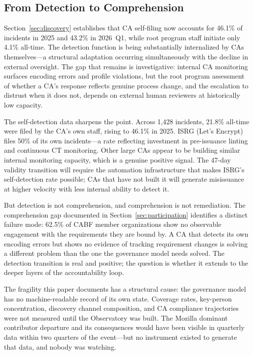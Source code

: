 \documentclass[10pt,twocolumn,letterpaper]{article}
\begin{document}
\subsection{From Detection to Comprehension}
Section~\ref{sec:discovery} establishes that CA self-filing now accounts
for 46.1\% of incidents in 2025 and 43.2\% in 2026~Q1, while root program
staff initiate only 4.1\% all-time. The detection function is being
substantially internalized by CAs themselves---a structural adaptation
occurring simultaneously with the decline in external oversight. The gap
that remains is investigative: internal CA monitoring surfaces encoding
errors and profile violations, but the root program assessment of whether
a CA's response reflects genuine process change, and the escalation to
distrust when it does not, depends on external human reviewers at
historically low capacity.

The self-detection data sharpens the point. Across 1,428 incidents, 21.8\%
all-time were filed by the CA's own staff, rising to 46.1\% in 2025.
ISRG (Let's Encrypt)~\cite{aas2019} files 50\% of its own incidents---a rate
reflecting investment in pre-issuance linting and continuous CT monitoring.
Other large CAs appear to be building similar internal monitoring capacity,
which is a genuine positive signal. The 47-day validity transition will
require the automation infrastructure that makes ISRG's self-detection
rate possible; CAs that have not built it will generate misissuance at
higher velocity with less internal ability to detect it.

But detection is not comprehension, and comprehension is not remediation.
The comprehension gap documented in Section~\ref{sec:participation}
identifies a distinct failure mode: 62.5\% of CABF member organizations
show no observable engagement with the requirements they are bound by.
A CA that detects its own encoding errors but shows no evidence of
tracking requirement changes is solving a different problem than the one
the governance model needs solved. The detection transition is real and
positive; the question is whether it extends to the deeper layers of
the accountability loop.

The fragility this paper documents has a structural cause: the governance
model has no machine-readable record of its own state. Coverage rates,
key-person concentration, discovery channel composition, and CA compliance
trajectories were not measured until the Observatory was built. The
Mozilla dominant contributor departure and its consequences would have been
visible in quarterly data within two quarters of the event---but no
instrument existed to generate that data, and nobody was watching.
\end{document}
